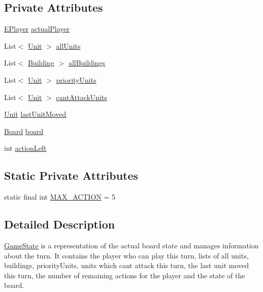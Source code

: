 \subsection*{Private Attributes}
\begin{DoxyCompactItemize}
\item 
\mbox{\hyperlink{enumgame_1_1_e_player}{E\+Player}} \mbox{\hyperlink{classgame_1_1game_state_1_1_game_state_a9b6b62e58a1ea7239dbac19581d0bc7e}{actual\+Player}}
\item 
List$<$ \mbox{\hyperlink{classgame_1_1board_1_1_unit}{Unit}} $>$ \mbox{\hyperlink{classgame_1_1game_state_1_1_game_state_ac3f3be0bc6fd5f54ebd5a4bc6ea82a6d}{all\+Units}}
\item 
List$<$ \mbox{\hyperlink{classgame_1_1board_1_1_building}{Building}} $>$ \mbox{\hyperlink{classgame_1_1game_state_1_1_game_state_a40fab1341385b8ece57ad4bf9fc3931a}{all\+Buildings}}
\item 
List$<$ \mbox{\hyperlink{classgame_1_1board_1_1_unit}{Unit}} $>$ \mbox{\hyperlink{classgame_1_1game_state_1_1_game_state_ae32c0ba11d25bb24b4b6f753deab679c}{priority\+Units}}
\item 
List$<$ \mbox{\hyperlink{classgame_1_1board_1_1_unit}{Unit}} $>$ \mbox{\hyperlink{classgame_1_1game_state_1_1_game_state_acd6622fa3145cd9c82a42de6e32bbf4c}{cant\+Attack\+Units}}
\item 
\mbox{\hyperlink{classgame_1_1board_1_1_unit}{Unit}} \mbox{\hyperlink{classgame_1_1game_state_1_1_game_state_acb8600c6c780c1381e1f0bedf54b3c5d}{last\+Unit\+Moved}}
\item 
\mbox{\hyperlink{classgame_1_1board_1_1_board}{Board}} \mbox{\hyperlink{classgame_1_1game_state_1_1_game_state_ad22688d7dca32fbc677dce94b9cf3862}{board}}
\item 
int \mbox{\hyperlink{classgame_1_1game_state_1_1_game_state_a26efcfe9c5276664b2e1a1b0bd83b745}{action\+Left}}
\end{DoxyCompactItemize}
\subsection*{Static Private Attributes}
\begin{DoxyCompactItemize}
\item 
static final int \mbox{\hyperlink{classgame_1_1game_state_1_1_game_state_ac08c06796c12e109d6db782ddcd50b5f}{M\+A\+X\+\_\+\+A\+C\+T\+I\+ON}} = 5
\end{DoxyCompactItemize}


\subsection{Detailed Description}
\mbox{\hyperlink{classgame_1_1game_state_1_1_game_state}{Game\+State}} is a representation of the actual board\textquotesingle{} state and manages information about the turn. It contains the player who can play this turn, lists of all units, buildings, priority\+Units, units which can\textquotesingle{}t attack this turn, the last unit moved this turn, the number of remaining actions for the player and the state of the board.

